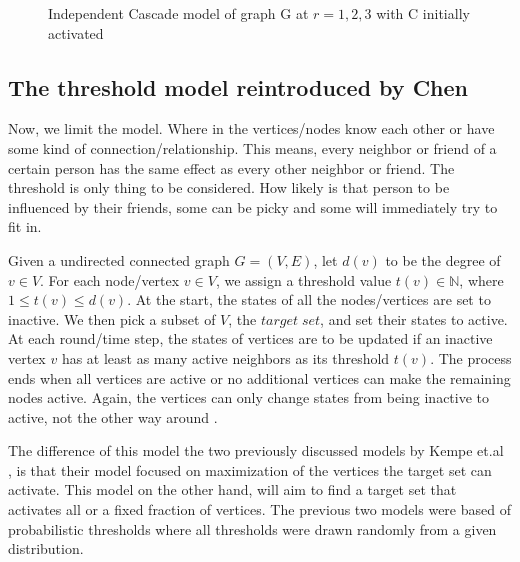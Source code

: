 \begin{figure}[h]
\begin{minipage}{0.45\textwidth}
	\end{minipage}
\caption{Independent Cascade model of graph G at $r=1,2,3$ with C initially activated}
\label{Independentfig1}
\end{figure}
\subsection{The threshold model reintroduced by Chen}

Now, we limit the model. Where in the vertices/nodes know each other or have some kind of connection/relationship. This means, every neighbor or friend of a certain person has the same effect as every other neighbor or friend. The threshold is only thing to be considered. How likely is that person to be influenced by their friends, some can be picky and some will immediately try to fit in. 

Given a undirected connected graph $G=(V,E)$, let $d(v)$ to be the degree of $v \in V$. For each node/vertex $v \in V$, we assign a threshold value $t(v) \in \mathbb{N}$, where $1 \leq t(v) \leq d(v)$. At the start, the states of all the nodes/vertices are set to inactive. We then pick a subset of $V$, the $target\; set$, and set their states to active. At each round/time step, the states of vertices are to be updated if an inactive vertex $v$ has at least as many active neighbors as its threshold $t(v)$. The process ends when all vertices are active or no additional vertices can make the remaining nodes active. Again, the vertices can only change states from being inactive to active, not the other way around \cite{chen}.

The difference of this model the two previously discussed models by Kempe et.al \cite{Kempe}\cite{Shakarian:2012:LSN:2456719.2457081}, is that their model focused on maximization of the vertices the target set can activate. This model on the other hand, will aim to find a target set that activates all or a fixed fraction of vertices. The previous two models were based of probabilistic thresholds where all thresholds were drawn randomly from a given distribution. \cite{Kempe}\cite{chen}

